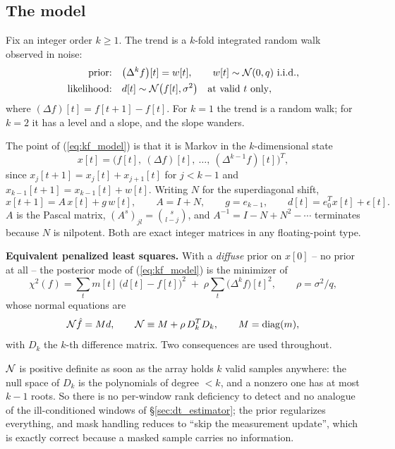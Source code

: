 \documentclass{article}
\numberwithin{equation}{section}   %
\def\nn{\nonumber}
\begin{document}
\subsection{The model}
\label{sec:kf_model}

Fix an integer order $k \ge 1$.  The trend is a $k$-fold integrated random walk observed in noise:
\begin{align}
\mbox{prior:} \quad & \big(\Delta^k f\big)[t] = w[t], \qquad w[t] \sim {\cal N}(0, q) \mbox{ i.i.d.}, \nn \\
\mbox{likelihood:} \quad & d[t] \sim {\cal N}\big(f[t], \sigma^2\big) \quad \mbox{at valid $t$ only},
\label{eq:kf_model}
\end{align}
where $(\Delta f)[t] = f[t+1]-f[t]$.  For $k=1$ the trend is a random walk; for $k=2$ it has a level and a
slope, and the slope wanders.

The point of (\ref{eq:kf_model}) is that it is Markov in the $k$-dimensional state
\begin{equation}
x[t] = \Big( f[t],\ (\Delta f)[t],\ \ldots,\ (\Delta^{k-1} f)[t] \Big)^T ,
\end{equation}
since $x_j[t+1] = x_j[t] + x_{j+1}[t]$ for $j < k-1$ and $x_{k-1}[t+1] = x_{k-1}[t] + w[t]$.  Writing $N$ for
the superdiagonal shift,
\begin{equation}
x[t+1] = A\,x[t] + g\,w[t], \qquad A = I + N, \qquad g = e_{k-1}, \qquad d[t] = e_0^T x[t] + \epsilon[t] .
\label{eq:kf_recursion}
\end{equation}
$A$ is the Pascal matrix, $(A^s)_{jl} = \binom{s}{l-j}$, and $A^{-1} = I - N + N^2 - \cdots$ terminates
because $N$ is nilpotent.  Both are exact integer matrices in any floating-point type.

{\bf Equivalent penalized least squares.}  With a {\em diffuse} prior on $x[0]$ -- no prior at all -- the
posterior mode of (\ref{eq:kf_model}) is the minimizer of
\begin{equation}
\chi^2(f) = \sum_t m[t]\,\big(d[t]-f[t]\big)^2 \;+\; \rho \sum_t \big(\Delta^k f\big)[t]^2 ,
\qquad \rho = \sigma^2/q ,
\label{eq:kf_chi2}
\end{equation}
whose normal equations are
\begin{equation}
{\cal N}\hat f = M d, \qquad {\cal N} \equiv M + \rho\, D_k^T D_k, \qquad M = {\rm diag}(m),
\label{eq:kf_normal}
\end{equation}
with $D_k$ the $k$-th difference matrix.  Two consequences are used throughout.

${\cal N}$ is positive definite as soon as the array holds $k$ valid samples anywhere: the null space of
$D_k$ is the polynomials of degree $<k$, and a nonzero one has at most $k-1$ roots.  So there is no
per-window rank deficiency to detect and no analogue of the ill-conditioned windows of
\S\ref{sec:dt_estimator}; the prior regularizes everything, and mask handling reduces to ``skip the
measurement update'', which is exactly correct because a masked sample carries no information.
\end{document}
